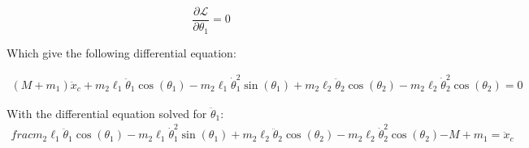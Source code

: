 \documentclass[10pt]{article}
\begin{document}
    
    \begin{equation} \label{eq: lagrange Step3}
        \frac{\partial \mathcal{L}}{\partial\theta_1} = 0
        \end{equation}

    Which give the following differential equation:

    \begin{equation}
        \begin{aligned}
            (M + m_1)\ddot x_c + m_2\ell_1\ddot\theta_1\cos(\theta_1) - m_2\ell_1\dot\theta_1^2\sin(\theta_1) + m_2\ell_2\ddot\theta_2\cos(\theta_2) - m_2\ell_2\dot\theta_2^2\cos(\theta_2) = 0
        \end{aligned}
    \end{equation}   

    With the differential equation solved for $\ddot \theta_1$:
    \begin{equation}
        \begin{aligned}
            frac{m_2\ell_1\ddot\theta_1\cos(\theta_1) - m_2\ell_1\dot\theta_1^2\sin(\theta_1) + m_2\ell_2\ddot\theta_2\cos(\theta_2) - m_2\ell_2\dot\theta_2^2\cos(\theta_2)}{-M+m_1} = \ddot x_c
        \end{aligned}
    \end{equation}  
\end{document}
